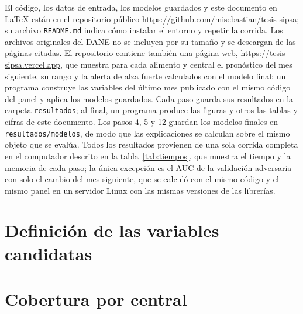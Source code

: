 El código, los datos de entrada, los modelos guardados y este documento en LaTeX están en el repositorio público \url{https://github.com/misebastian/tesis-sipsa}; su archivo \texttt{README.md} indica cómo instalar el entorno y repetir la corrida. Los archivos originales del DANE no se incluyen por su tamaño y se descargan de las páginas citadas. El repositorio contiene también una página web, \url{https://tesis-sipsa.vercel.app}, que muestra para cada alimento y central el pronóstico del mes siguiente, su rango y la alerta de alza fuerte calculados con el modelo final; un programa construye las variables del último mes publicado con el mismo código del panel y aplica los modelos guardados. Cada paso guarda sus resultados en la carpeta \texttt{resultados}; al final, un programa produce las figuras y otros las tablas y cifras de este documento. Los pasos 4, 5 y 12 guardan los modelos finales en \texttt{resultados/modelos}, de modo que las explicaciones se calculan sobre el mismo objeto que se evalúa. Todos los resultados provienen de una sola corrida completa en el computador descrito en la tabla~\ref{tab:tiempos}, que muestra el tiempo y la memoria de cada paso; la única excepción es el AUC de la validación adversaria con solo el cambio del mes siguiente, que se calculó con el mismo código y el mismo panel en un servidor Linux con las mismas versiones de las librerías.





\section{Definición de las variables candidatas}
\label{ap:variables}





\section{Cobertura por central}
\label{ap:centrales}

